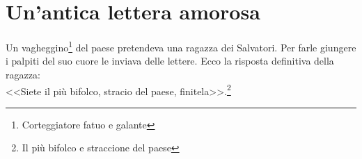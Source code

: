 
\chapter{Un'antica lettera amorosa}
Un vagheggino\footnote{Corteggiatore fatuo e galante} del paese pretendeva una ragazza dei Salvatori. Per farle giungere i palpiti del suo cuore le inviava delle lettere. Ecco la risposta definitiva della ragazza:\\ 
\indent <<Siete il più bifolco, stracio del paese, finitela>>.\footnote{Il più bifolco e straccione del paese} 
